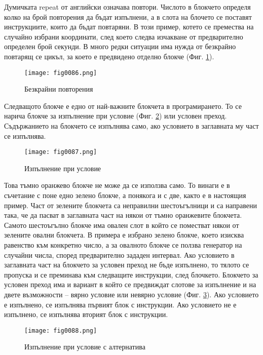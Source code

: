 Думичката repeat от английски означава повтори. Числото в блокчето определя колко на брой повторения да бъдат изпълнени, а в слота на блочето се поставят инструкциите, които да бъдат повтаряни. В този пример, котето се премества на случайно избрани координати, след което следва изчакване от предварително определен брой секунди. В много редки ситуации има нужда от безкрайно повтарящ се цикъл, за което е предвидено отделно блокче (Фиг. \ref{fig0086}).

\begin{figure}[H]
  \centering
  \texttt{[image: fig0086.png]}
  \caption{Безкрайни повторения}
\label{fig0086}
\end{figure}

Следващото блокче е едно от най-важните блокчета в програмирането. То се нарича блокче за изпълнение при условие (Фиг. \ref{fig0087}) или условен преход. Съдържанието на блокчето се изпълнява само, ако условието в заглавната му част се изпълнява.

\begin{figure}[H]
  \centering
  \texttt{[image: fig0087.png]}
  \caption{Изпълнение при условие}
\label{fig0087}
\end{figure}

Това тъмно оранжево блокче не може да се използва само. То винаги е в съчетание с поне едно зелено блокче, а понякога и с две, както е в настоящия пример. Част от зелените блокчета са неправилни шестоъгълници и са направени така, че да пасват в заглавната част на някои от тъмно оранжевите блокчета. Самото шестоъгълно блокче има овален слот в който се поместват някои от зелените овални блокчета. В примера е избрано зелено блокче, което изисква равенство към конкретно число, а за овалното блокче се ползва генератор на случайни числа, според предварително зададен интервал. Ако условието в заглавната част на блокчето за условен преход не бъде изпълнено, то тялото се пропуска и се преминава към следващите инструкции, след блочкето. Блокчето за условен преход има и вариант в който се предвиждат слотове за изпълнение и на двете възможности – вярно условие или невярно условие (Фиг. \ref{fig0088}). Ако условието е изпълнено, се изпълнява първият блок с инструкции. Ако условието не е изпълнено, се изпълнява вторият блок с инструкции.

\begin{figure}[H]
  \centering
  \texttt{[image: fig0088.png]}
  \caption{Изпълнение при условие с алтернатива}
\label{fig0088}
\end{figure}

